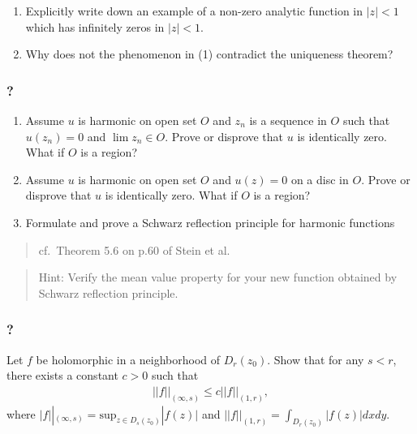 \begin{enumerate}
\def\labelenumi{(\arabic{enumi})}
\item
  Explicitly write down an example of a non-zero analytic function in
  \(|z|<1\) which has infinitely zeros in \(|z|<1\).
\item
  Why does not the phenomenon in (1) contradict the uniqueness theorem?
\end{enumerate}

\hypertarget{section-166}{%
\subsubsection{?}\label{section-166}}

\begin{enumerate}
\def\labelenumi{(\arabic{enumi})}
\item
  Assume \(u\) is harmonic on open set \(O\) and \(z_n\) is a sequence
  in \(O\) such that \(u(z_n) = 0\) and \(\lim z_n \in O\). Prove or
  disprove that \(u\) is identically zero. What if \(O\) is a region?
\item
  Assume \(u\) is harmonic on open set \(O\) and \(u(z) = 0\) on a disc
  in \(O\). Prove or disprove that \(u\) is identically zero. What if
  \(O\) is a region?
\item
  Formulate and prove a Schwarz reflection principle for harmonic
  functions
\end{enumerate}

\begin{quote}
cf.~Theorem 5.6 on p.60 of Stein et al.
\end{quote}

\begin{quote}
Hint: Verify the mean value property for your new function obtained by
Schwarz reflection principle.
\end{quote}

\hypertarget{section-167}{%
\subsubsection{?}\label{section-167}}

Let \(f\) be holomorphic in a neighborhood of \(D_r(z_0)\). Show that
for any \(s<r\), there exists a constant \(c>0\) such that
\begin{align*}||f||_{(\infty, s)} \leq c ||f||_{(1, r)},\end{align*}
where
\(\displaystyle |f||_{(\infty, s)} = \text{sup}_{z \in D_s(z_0)}|f(z)|\)
and \(\displaystyle ||f||_{(1, r)} = \int_{D_r(z_0)} |f(z)|dx dy\).

